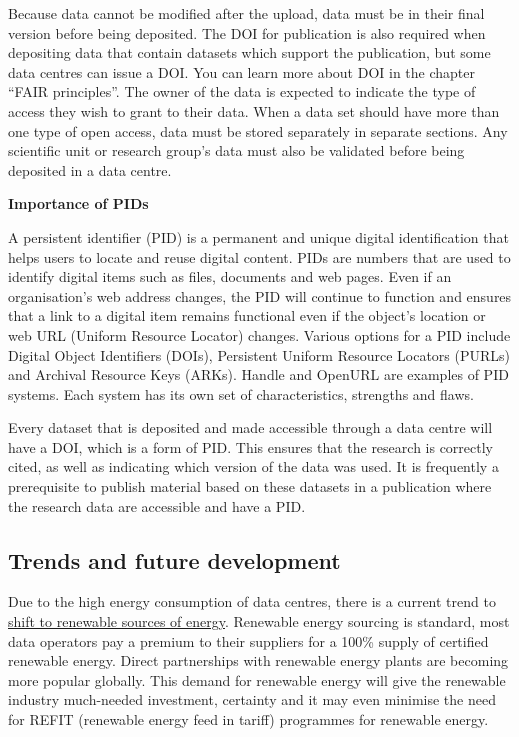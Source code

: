 \documentclass[
]{book}
\begin{document}
Because data cannot be modified after the upload, data must be in their final version before being deposited. The DOI for publication is also required when depositing data that contain datasets which support the publication, but some data centres can issue a DOI. You can learn more about DOI in the chapter ``FAIR principles''. The owner of the data is expected to indicate the type of access they wish to grant to their data. When a data set should have more than one type of open access, data must be stored separately in separate sections. Any scientific unit or research group's data must also be validated before being deposited in a data centre.

\textbf{Importance of PIDs}

A persistent identifier (PID) is a permanent and unique digital identification that helps users to locate and reuse digital content. PIDs are numbers that are used to identify digital items such as files, documents and web pages. Even if an organisation's web address changes, the PID will continue to function and ensures that a link to a digital item remains functional even if the object's location or web URL (Uniform Resource Locator) changes. Various options for a PID include Digital Object Identifiers (DOIs), Persistent Uniform Resource Locators (PURLs) and Archival Resource Keys (ARKs). Handle and OpenURL are examples of PID systems. Each system has its own set of characteristics, strengths and flaws.

Every dataset that is deposited and made accessible through a data centre will have a DOI, which is a form of PID. This ensures that the research is correctly cited, as well as indicating which version of the data was used. It is frequently a prerequisite to publish material based on these datasets in a publication where the research data are accessible and have a PID.

\hypertarget{trends-and-future-development}{%
\subsection*{Trends and future development}\label{trends-and-future-development}}

Due to the high energy consumption of data centres, there is a current trend to \href{https://bitpower.ie/images/Reports/2021_H1_Report.pdf}{shift to renewable sources of energy}. Renewable energy sourcing is standard, most data operators pay a premium to their suppliers for a 100\% supply of certified renewable energy. Direct partnerships with renewable energy plants are becoming more popular globally. This demand for renewable energy will give the renewable industry much-needed investment, certainty and it may even minimise the need for REFIT (renewable energy feed in tariff) programmes for renewable energy.
\end{document}
